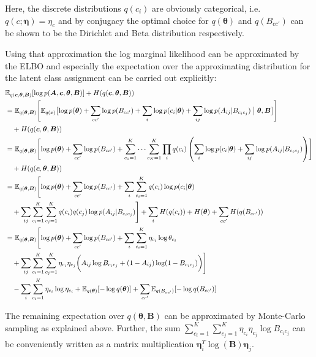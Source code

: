 \documentclass{article}
\renewcommand{\v}[1]{\bm{#1}}
\newcommand{\E}{\mathbb{E}}
\begin{document}
Here, the discrete distributions $q(c_i)$ are obviously categorical,
i.e. $q(c; \v{\eta}) = \eta_{c}$ and by conjugacy the optimal choice
for $q(\v{\theta})$ and $q(B_{cc'})$ can be shown to be the Dirichlet
and Beta distribution respectively.

Using that approximation the log marginal likelihood can be
approximated by the ELBO and especially the expectation over the
approximating distribution for the latent class assignment can be
carried out explicitly:
\begin{equation}
\begin{aligned}
& \E_{q(\v{c}, \v{\theta}, \v{B})}[\log p(\v{A}, \v{c}, \v{\theta}, \v{B})] + H(q(\v{c}, \v{\theta}, \v{B})) \\ 
&= \E_{q(\v{\theta}, \v{B})} \Biggl[ \E_{q(\v{c})} \bigl[ \log p(\v{\theta}) + \sum_{cc'} \log p(B_{cc'}) + \sum_i \log p(c_i | \v{\theta}) + \sum_{ij} \log p(A_{ij} | B_{c_ic_j}) \bigm\vert \v{\theta}, \v{B} \bigr] \Biggr]\\ 
& \quad + H(q(\v{c}, \v{\theta}, \v{B})) \\
&= \E_{q(\v{\theta}, \v{B})}\Biggl[ \log p(\v{\theta}) + \sum_{cc'} \log p(B_{cc'}) + \sum_{c_1=1}^K \cdots \sum_{c_N=1}^K \prod_i q(c_i) \left( \sum_i \log p(c_i | \v{\theta}) + \sum_{ij} \log p(A_{ij} | B_{c_ic_j}) \right) \Biggr]\\ 
& \quad + H(q(\v{c}, \v{\theta}, \v{B})) \\
&= \E_{q(\v{\theta}, \v{B})}\Biggl[ \log p(\v{\theta}) + \sum_{cc'} \log p(B_{cc'}) + \sum_i \sum_{c_i=1}^K q(c_i) \log p(c_i | \v{\theta})\\
& \quad + \sum_{ij} \sum_{c_i=1}^K \sum_{c_j=1}^K q(c_i) q(c_j) \log p(A_{ij} | B_{c_ic_j})\Biggr] + \sum_i H(q(c_i)) + H(\v{\theta}) + \sum_{cc'} H(q(B_{cc'})) \\
&= \E_{q(\v{\theta}, \v{B})}\Biggl[ \log p(\v{\theta}) + \sum_{cc'} \log p(B_{cc'}) + \sum_i \sum_{c_i=1}^K \eta_{c_i} \log \theta_{c_i}\\ 
& \quad + \sum_{ij} \sum_{c_i=1}^K \sum_{c_j=1}^K \eta_{c_i} \eta_{c_j} \biggl( A_{ij} \log B_{c_ic_j} + (1 - A_{ij}) \log (1 - B_{c_ic_j})\biggr) \Biggr] \\
& \quad - \sum_i \sum_{c_i=1}^K \eta_{c_i} \log \eta_{c_i} + \E_{q(\v{\theta})}[- \log q(\v{\theta})] + \sum_{cc'} \E_{q(B_{cc'})}[- \log q(B_{cc'})]\\
\end{aligned}
\end{equation}

The remaining expectation over $q(\v{\theta}, \v{B})$ can be
approximated by Monte-Carlo sampling as explained above. Further, the
sum $\sum_{c_i=1}^K \sum_{c_j=1}^K \eta_{c_i} \eta_{c_j} \log
B_{c_ic_j}$ can be conveniently written as a matrix multiplication
$\v{\eta}_i^T \log(\v{B}) \v{\eta}_j$.
\end{document}
